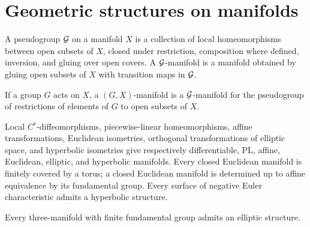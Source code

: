 \chapter{Geometric structures on manifolds}

\begin{definition}
\label{thurston-ch03-pseudogroup}

A pseudogroup \(\mathcal{G}\) on a manifold \(X\) is a collection of local homeomorphisms between open subsets of \(X\), closed under restriction, composition where defined, inversion, and gluing over open covers. A \(\mathcal{G}\)-manifold is a manifold obtained by gluing open subsets of \(X\) with transition maps in \(\mathcal{G}\).
\end{definition}

\begin{definition}
\label{thurston-ch03-gx-manifold}

If a group \(G\) acts on \(X\), a \((G,X)\)-manifold is a \(\mathcal{G}\)-manifold for the pseudogroup of restrictions of elements of \(G\) to open subsets of \(X\).
\end{definition}

\begin{remark}
\label{thurston-ch03-basic-models}

Local \(C^r\)-diffeomorphisms, piecewise-linear homeomorphisms, affine transformations, Euclidean isometries, orthogonal transformations of elliptic space, and hyperbolic isometries give respectively differentiable, PL, affine, Euclidean, elliptic, and hyperbolic manifolds. Every closed Euclidean manifold is finitely covered by a torus; a closed Euclidean manifold is determined up to affine equivalence by its fundamental group. Every surface of negative Euler characteristic admits a hyperbolic structure.
\end{remark}

\begin{conjecture}
\label{thurston-ch03-elliptic-conjecture}

Every three-manifold with finite fundamental group admits an elliptic structure.
\end{conjecture}

